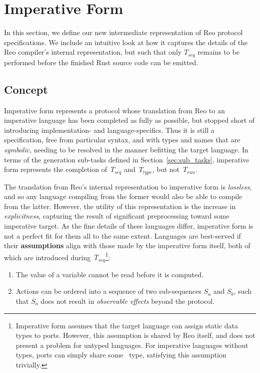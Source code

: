 \section{Imperative Form}
\label{sec:imperative_form_sec}
In this section, we define our new intermediate representation of Reo protocol specifications. We include an intuitive look at how it captures the details of the Reo compiler's internal representation, but such that only $T_{seq}$ remains to be performed before the finished Rust source code can be emitted.


\subsection{Concept}
Imperative form represents a protocol whose translation from Reo to an imperative language has been completed as fully as possible, but stopped short of introducing implementation- and language-specifics. Thus it is still a specification, free from particular syntax, and with types and names that are \textit{symbolic}, needing to be resolved in the manner befitting the target language. In terms of the generation sub-tasks defined in Section~\ref{sec:sub_tasks}, imperative form represents the completion of~$T_{seq}$ and~$T_{type}$, but not~$T_{run}$.

The translation from Reo's internal representation to imperative form is \textit{lossless}, and so any language compiling from the former would also be able to compile from the latter. However, the utility of this representation is the increase in \textit{explicitness}, capturing the result of significant preprocessing toward some imperative target. As the fine details of these languages differ, imperative form is not a perfect fit for them all to the same extent. Languages are best-served if their \textbf{assumptions} align with those made by the imperative form itself, both of which are introduced during~$T_{seq}$\footnote{Imperative form assumes that the target language can assign static data types to ports. However, this assumption is shared by Reo itself, and does not present a problem for untyped languages. For imperative languages without types, ports can simply share some~ type, satisfying this assumption trivially.}:
\begin{enumerate}
\item The value of a variable cannot be read before it is computed.
\item Actions can be ordered into a sequence of two sub-sequences $S_a$ and $S_b$, such that $S_a$ does not result in \textit{observable effects} beyond the protocol.
\end{enumerate}

